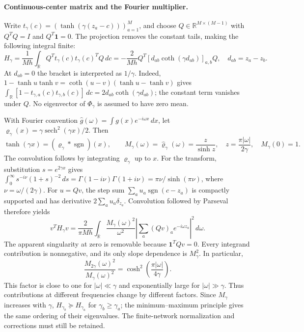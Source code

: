 \paragraph{Continuous-center matrix and the Fourier multiplier.}
Write $t_\gamma(c)=(\tanh(\gamma(z_a-c)))_{a=1}^M$, and choose
$Q\in\mathbb R^{M\times(M-1)}$ with $Q^TQ=I$ and $Q^T\mathbf1=0$.
The projection removes the constant tails, making the following integral finite:
\begin{equation}
 H_\gamma=\frac1{Mh}\int_{\mathbb R}
 Q^Tt_\gamma(c)t_\gamma(c)^TQ\,dc
 =-\frac2{Mh}Q^T[d_{ab}\coth(\gamma d_{ab})]_{a,b}Q,
 \quad d_{ab}=z_a-z_b.
 \label{eq:note-integral-matrix}
\end{equation}
At $d_{ab}=0$ the bracket is interpreted as $1/\gamma$.
Indeed, $1-\tanh u\tanh v=\coth(u-v)(\tanh u-\tanh v)$ gives
$\int_{\mathbb R}[1-t_{\gamma,a}(c)t_{\gamma,b}(c)]\,dc
=2d_{ab}\coth(\gamma d_{ab})$; the constant term vanishes under $Q$.
No eigenvector of $\Phi_\gamma$ is assumed to have zero mean.

With Fourier convention $\widehat g(\omega)=\int g(x)e^{-i\omega x}\,dx$,
let $\varrho_\gamma(x)=\gamma\operatorname{sech}^2(\gamma x)/2$. Then
\begin{equation}
 \tanh(\gamma x)=(\varrho_\gamma*\operatorname{sgn})(x),\qquad
 M_\gamma(\omega)=\widehat\varrho_\gamma(\omega)
 =\frac{z}{\sinh z},\quad z=\frac{\pi|\omega|}{2\gamma},\quad M_\gamma(0)=1.
 \label{eq:note-multiplier}
\end{equation}
The convolution follows by integrating $\varrho_\gamma$ up to $x$.
For the transform, substitution $s=e^{2\gamma x}$ gives
$\int_0^\infty s^{-i\nu}(1+s)^{-2}\,ds
=\Gamma(1-i\nu)\Gamma(1+i\nu)=\pi\nu/\sinh(\pi\nu)$,
where $\nu=\omega/(2\gamma)$.
For $u=Qv$, the step sum $\sum_a u_a\operatorname{sgn}(c-z_a)$ is
compactly supported and has derivative $2\sum_a u_a\delta_{z_a}$.
Convolution followed by Parseval therefore yields
\begin{equation}
 v^TH_\gamma v=\frac2{\pi Mh}\int_{\mathbb R}
 \frac{M_\gamma(\omega)^2}{\omega^2}
 \left|\sum_a(Qv)_a e^{-i\omega z_a}\right|^2\,d\omega.
 \label{eq:note-fourier-quadratic}
\end{equation}
The apparent singularity at zero is removable because $\mathbf1^TQv=0$.
Every integrand contribution is nonnegative, and its only slope dependence
is $M_\gamma^2$. In particular,
\begin{equation}
 \frac{M_{2\gamma}(\omega)^2}{M_\gamma(\omega)^2}
 =\cosh^2\!\left(\frac{\pi|\omega|}{4\gamma}\right).
 \label{eq:note-multiplier-gain}
\end{equation}
This factor is close to one for $|\omega|\ll\gamma$ and exponentially
large for $|\omega|\gg\gamma$. Thus contributions at different frequencies
change by different factors. Since $M_\gamma$ increases with $\gamma$,
$H_{\gamma_b}\succeq H_{\gamma_a}$ for $\gamma_b\ge\gamma_a$;
the minimum--maximum principle gives the same ordering of their eigenvalues.
The finite-network normalization and corrections must still be retained.

